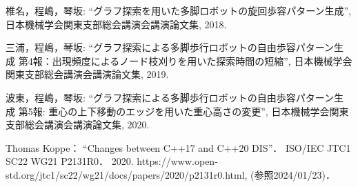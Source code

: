 \begin{thebibliography}{99}
    椎名，程嶋，琴坂: 
    ``グラフ探索を用いた多脚ロボットの旋回歩容パターン生成'',
    日本機械学会関東支部総会講演会講演論文集,
    2018.

    三浦，程嶋，琴坂: 
    ``グラフ探索による多脚歩行ロボットの自由歩容パターン生成 第4報：出現頻度によるノード枝刈りを用いた探索時間の短縮'',
    日本機械学会関東支部総会講演会講演論文集,
    2019.

    波東，程嶋，琴坂: 
    ``グラフ探索による多脚歩行ロボットの自由歩容パターン生成 第5報: 重心の上下移動のエッジを用いた重心高さの変更'',
    日本機械学会関東支部総会講演会講演論文集,
    2020.

    Thomas Koppe：
    ``Changes between C++17 and C++20 DIS''．
    ISO/IEC JTC1 SC22 WG21 P2131R0．
    2020.
    https://www.open-std.org/jtc1/sc22/wg21/docs/papers/2020/p2131r0.html, 
    (参照2024/01/23)．


\end{thebibliography}
\endinput